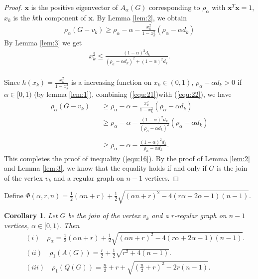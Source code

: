 \documentclass[amsthm]{elsart}
\newtheorem{corollary}{Corollary}[section]
\begin{document}
\begin{proof}
$\textbf{x}$ is the positive eigenvector of $A_\alpha (G)$ corresponding to $\rho _\alpha$  with $\textbf{x}^T \textbf{x} = 1$, $x_k$ is the $k$th component of $\textbf{x}$.
By Lemma \ref {lem:2}, we obtain \\
\begin{eqnarray} \label{equ:21}
\rho _\alpha (G - v_k)
    \geqslant \rho _\alpha - \alpha - \frac{x_k^2}{1 - x_k^2} (\rho _\alpha - \alpha d_k)
\end{eqnarray}
By Lemma \ref {lem:3} we get
\begin{eqnarray} \label{equ:22}
x_k^2 \leqslant \frac{(1 - \alpha)^2 d_k}{(\rho _\alpha - \alpha d_k)^2 + (1 - \alpha)^2 d_k}.
\end{eqnarray}
\\
Since $h(x_k) = \frac{x_k^2}{1 - x_k^2} $ is a increasing function on $x_k \in (0, 1)$, $\rho _\alpha - \alpha d_k > 0$ if $\alpha \in [0, 1)$ (by lemma \ref{lem:1}), combining (\ref{equ:21})with (\ref{equ:22}), we have  \\
\begin{eqnarray*}
\rho _\alpha (G - v_k)
  &&\geqslant \rho _\alpha - \alpha - \frac{x_k^2}{1 - x_k^2} (\rho _\alpha - \alpha d_k)
  \\ &&\geqslant \rho _\alpha - \alpha - \frac{(1 - \alpha)^2 d_k}{(\rho _\alpha - \alpha d_k)^2} (\rho _\alpha - \alpha d_k)  \\
  \\ &&\geqslant \rho _\alpha - \alpha - \frac{(1 - \alpha)^2 d_k}{\rho _\alpha - \alpha d_k}
.
\end{eqnarray*}
This completes the proof of inequality (\ref{equ:16}).
By the proof of Lemma \ref {lem:2} and Lemma \ref {lem:3}, we know that the equality holds if and only if $G$ is the join of the vertex $v_k$ and a regular graph on $n-1$ vertices.
\end{proof}

Define $\Phi(\alpha, r, n) = \frac{1}{2}(\alpha n + r) + \frac{1}{2} \sqrt{(\alpha n + r)^2 - 4 (r \alpha + 2 \alpha - 1) ( n - 1) }$.
\begin{corollary} \label{coro:1}
Let $G$ be the join of the vertex $v_k$ and a $r$-regular graph on $n-1$ vertices, $\alpha \in [0, 1)$.  Then
\begin{eqnarray*}
&&(i) \quad \rho _\alpha = \frac{1}{2}(\alpha n + r) + \frac{1}{2} \sqrt{(\alpha n + r)^2 - 4 (r \alpha + 2 \alpha - 1) ( n - 1) }.
\\ &&(ii) \quad \rho _1(A(G)) = \frac{r}{2} + \frac{1}{2} \sqrt{r ^2 + 4 ( n - 1) }.
\\ &&(iii) \quad \rho _1(Q(G)) = \frac{n}{2} + r +  \sqrt{(\frac{n}{2} + r)^2 - 2 r ( n - 1) }.
\end{eqnarray*}
\end{corollary}
\end{document}
